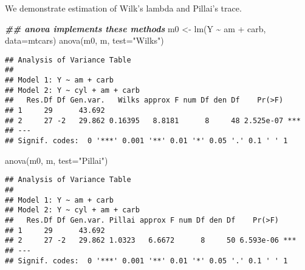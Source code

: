 \documentclass[
  ignorenonframetext,
]{beamer}
\newenvironment{Shaded}{\begin{snugshade}}{\end{snugshade}}
\newcommand{\AttributeTok}[1]{\textcolor[rgb]{0.77,0.63,0.00}{#1}}
\newcommand{\DocumentationTok}[1]{\textcolor[rgb]{0.56,0.35,0.01}{\textbf{\textit{#1}}}}
\newcommand{\FunctionTok}[1]{\textcolor[rgb]{0.00,0.00,0.00}{#1}}
\newcommand{\NormalTok}[1]{#1}
\newcommand{\OtherTok}[1]{\textcolor[rgb]{0.56,0.35,0.01}{#1}}
\newcommand{\SpecialCharTok}[1]{\textcolor[rgb]{0.00,0.00,0.00}{#1}}
\newcommand{\StringTok}[1]{\textcolor[rgb]{0.31,0.60,0.02}{#1}}
\begin{document}
\begin{frame}[fragile]{}
\protect\hypertarget{section-5}{}
We demonstrate estimation of Wilk's lambda and Pillai's trace.

\vspace{12pt}
\tiny

\begin{Shaded}
\begin{Highlighting}[]
\DocumentationTok{\#\# anova implements these methods}
\NormalTok{m0 }\OtherTok{\textless{}{-}} \FunctionTok{lm}\NormalTok{(Y }\SpecialCharTok{\textasciitilde{}}\NormalTok{ am }\SpecialCharTok{+}\NormalTok{ carb, }\AttributeTok{data=}\NormalTok{mtcars)}
\FunctionTok{anova}\NormalTok{(m0, m, }\AttributeTok{test=}\StringTok{"Wilks"}\NormalTok{)}
\end{Highlighting}
\end{Shaded}

\begin{verbatim}
## Analysis of Variance Table
## 
## Model 1: Y ~ am + carb
## Model 2: Y ~ cyl + am + carb
##   Res.Df Df Gen.var.   Wilks approx F num Df den Df    Pr(>F)    
## 1     29      43.692                                             
## 2     27 -2   29.862 0.16395   8.8181      8     48 2.525e-07 ***
## ---
## Signif. codes:  0 '***' 0.001 '**' 0.01 '*' 0.05 '.' 0.1 ' ' 1
\end{verbatim}

\begin{Shaded}
\begin{Highlighting}[]
\FunctionTok{anova}\NormalTok{(m0, m, }\AttributeTok{test=}\StringTok{"Pillai"}\NormalTok{)}
\end{Highlighting}
\end{Shaded}

\begin{verbatim}
## Analysis of Variance Table
## 
## Model 1: Y ~ am + carb
## Model 2: Y ~ cyl + am + carb
##   Res.Df Df Gen.var. Pillai approx F num Df den Df    Pr(>F)    
## 1     29      43.692                                            
## 2     27 -2   29.862 1.0323   6.6672      8     50 6.593e-06 ***
## ---
## Signif. codes:  0 '***' 0.001 '**' 0.01 '*' 0.05 '.' 0.1 ' ' 1
\end{verbatim}
\end{frame}
\end{document}
